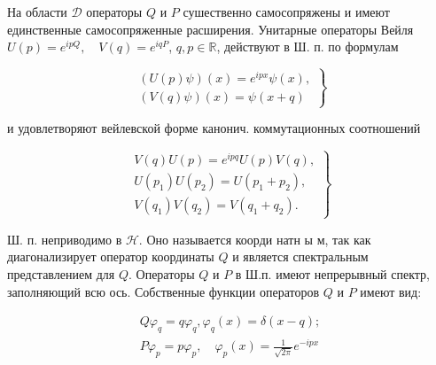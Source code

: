 \documentclass[10pt]{article}
\begin{document}
На области $\mathscr{D}$ операторы $Q$ и $P$ сушественно самосопряжены и имеют единственные самосопряженные расширения. Унитарные операторы Вейля $U(p)=e^{i p Q}, \quad V(q)=e^{i q P}$, $q, p \in \mathbb{R}$, действуют в Ш. п. по формулам



\[

\left.\begin{array}{l}

(U(p) \psi)(x)=e^{i p x} \psi(x), \\

(V(q) \psi)(x)=\psi(x+q)

\end{array}\right\}

\]



и удовлетворяют вейлевской форме канонич. коммутационных соотношений



\[

\left.\begin{array}{l}

V(q) U(p)=e^{i p q} U(p) V(q), \\

U\left(p_{1}\right) U\left(p_{2}\right)=U\left(p_{1}+p_{2}\right), \\

V\left(q_{1}\right) V\left(q_{2}\right)=V\left(q_{1}+q_{2}\right) .

\end{array}\right\}

\]



Ш. п. неприводимо в $\mathscr{H}$. Оно называется коорди натн ы м, так как диагонализирует оператор координаты $Q$ и является спектральным представлением для $Q$. Операторы $Q$ и $P$ в Ш.п. имеют непрерывный спектр, заполняющий всю ось. Собственные функции операторов $Q$ и $P$ имеют вид:



\[

\begin{gathered}

Q \varphi_{q}=q \varphi_{q}, \varphi_{q}(x)=\delta(x-q) ; \\

P \varphi_{p}=p \varphi_{p}, \quad \varphi_{p}(x)=\frac{1}{\sqrt{2 \pi}} e^{-i p x}

\end{gathered}

\]
\end{document}
